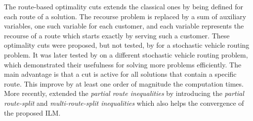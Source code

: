 \documentclass[11pt]{article}
\theoremstyle{definition}
\begin{document}
The route-based optimality cuts extends the classical ones by being defined for each route of a solution. The recourse problem is replaced by a sum of auxiliary variables, one such variable for each customer, and each variable represents the recourse of a route which starts exactly by serving such a customer. These optimality cuts were proposed, but not tested, by \citet{Seguin1994} for a stochastic vehicle routing problem. It was later tested by \citet{Cote2020} on a different stochastic vehicle routing problem, which demonstrated their usefulness for solving more problems efficiently. The main advantage is that a cut is active for all solutions that contain a specific route. This improve by at least one order of magnitude the computation times. More recently, \citet{Hoogendoorn2023} extended the \textit{partial route inequalities} by introducing the \textit{partial route-split} and \textit{multi-route-split inequalities} which also helps the convergence of the proposed ILM.

%
%
%
%
\end{document}
